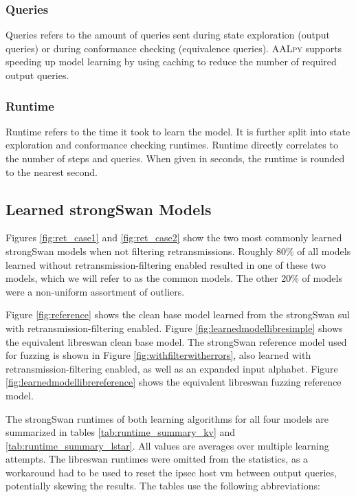 \subsubsection*{Queries}
Queries refers to the amount of queries sent during state exploration (output queries) or during conformance checking (equivalence queries). \textsc{AALpy} supports speeding up model learning by using caching to reduce the number of required output queries. 

\subsubsection*{Runtime}
Runtime refers to the time it took to learn the model. It is further split into state exploration and conformance checking runtimes. Runtime directly correlates to the number of steps and queries. When given in seconds, the runtime is rounded to the nearest second.


\subsection{Learned strongSwan Models} \label{subsec:models}
Figures \ref{fig:ret_case1} and \ref{fig:ret_case2} show the two most commonly learned strongSwan models when not filtering retransmissions. Roughly 80\% of all models learned without retransmission-filtering enabled resulted in one of these two models, which we will refer to as the common models. The other 20\% of models were a non-uniform assortment of outliers. 

Figure \ref{fig:reference} shows the clean base model learned from the strongSwan \ac{sul} with retransmission-filtering enabled. Figure \ref{fig:learnedmodellibresimple} shows the equivalent libreswan clean base model. The strongSwan reference model used for fuzzing is shown in Figure \ref{fig:withfilterwitherrors}, also learned with retransmission-filtering enabled, as well as an expanded input alphabet. Figure \ref{fig:learnedmodellibrereference} shows the equivalent libreswan fuzzing reference model.

The strongSwan runtimes of both learning algorithms for all four models are summarized in tables \ref{tab:runtime_summary_kv} and \ref{tab:runtime_summary_lstar}. All values are averages over multiple learning attempts. The libreswan runtimes were omitted from the statistics, as a workaround had to be used to reset the \ac{ipsec} host \ac{vm} between output queries, potentially skewing the results. The tables use the following abbreviations:

